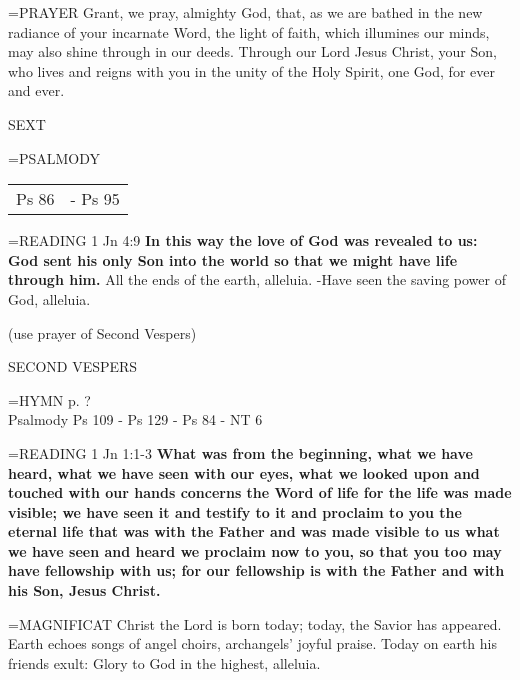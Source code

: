 \hangindent=\parindent \small{PRAYER 	Grant, we pray, almighty God, that, as we are bathed in the new radiance of your incarnate Word, the light of faith, which illumines our minds, may also shine through in our deeds. Through our Lord Jesus Christ, your Son, who lives and reigns with you in the unity of the Holy Spirit, one God, for ever and ever.}

\begin{flushleft}\normalsize SEXT\\\end{flushleft}
\hangindent=\parindent \small{PSALMODY}
\begin{center}
\begin{tabular}{ l l }
Ps 86 &  - Ps 95\\
\end{tabular}
\end{center}		

\hangindent=\parindent \small{READING}    1 Jn 4:9 \textbf{    In this way the love of God was revealed to us: God sent his only Son into the world so that we might have life through him.}
All the ends of the earth, alleluia.
-Have seen the saving power of God, alleluia.

(use prayer of Second Vespers)

\begin{flushleft}\normalsize SECOND VESPERS\\\end{flushleft}
\hangindent=\parindent \small{\uppercase{HYMN} p.  ?\\}
Psalmody
Ps 109 - Ps 129 - Ps 84 - NT 6

\hangindent=\parindent \small{READING}    1 Jn 1:1-3 \textbf{   What was from the beginning, what we have heard, what we have seen with our eyes, what we looked upon and touched with our hands concerns the Word of life for the life was made visible; we have seen it and testify to it and proclaim to you the eternal life that was with the Father and was made visible to us what we have seen and heard we proclaim now to you, so that you too may have fellowship with us; for our fellowship is with the Father and with his Son, Jesus Christ.\\}

\hangindent=\parindent \small{MAGNIFICAT 	Christ the Lord is born today; today, the Savior has appeared. Earth echoes songs of angel choirs, archangels' joyful praise. Today on earth his friends exult: Glory to God in the highest, alleluia.\\}

